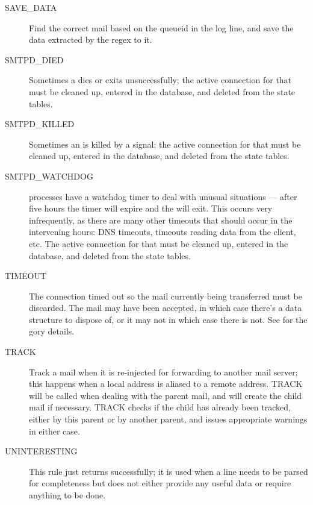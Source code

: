 \begin{description}
    \item [SAVE\_DATA] Find the correct mail based on the queueid in
        the log line, and save the data extracted by the regex to it.

    \item [SMTPD\_DIED] Sometimes a  dies or exits
        unsuccessfully; the active connection for that  must
        be cleaned up, entered in the database, and deleted from the state
        tables.

    \item [SMTPD\_KILLED] Sometimes an  is killed by a
        signal; the active connection for
        that  must be cleaned up, entered in the database,
        and deleted from the state tables.

    \item [SMTPD\_WATCHDOG]  processes have a watchdog timer
        to deal with unusual situations --- after five hours the timer will
        expire and the  will exit.  This occurs very
        infrequently, as there are many other timeouts that should occur
        in the intervening hours: DNS timeouts, timeouts reading data
        from the client, etc\@.  The active connection for that
         must be cleaned up, entered in the database, and
        deleted from the state tables.

    \item [TIMEOUT] The connection timed out so the mail currently being
        transferred must be discarded. The mail may have been accepted, in
        which case there's a data structure to dispose of, or it may not in
        which case there is not.  See
         for the gory details.

    \item [TRACK] Track a mail when it is re-injected for forwarding to
        another mail server; this happens when a local address is aliased
        to a remote address.  TRACK will be called when dealing with the
        parent mail, and will create the child mail if necessary. TRACK
        checks if the child has already been tracked, either by this parent
        or by another parent, and issues appropriate warnings in either
        case.

    \item [UNINTERESTING] This rule just returns successfully; it is used
        when a line needs to be parsed for completeness but does not either
        provide any useful data or require anything to be done.

\end{description}

